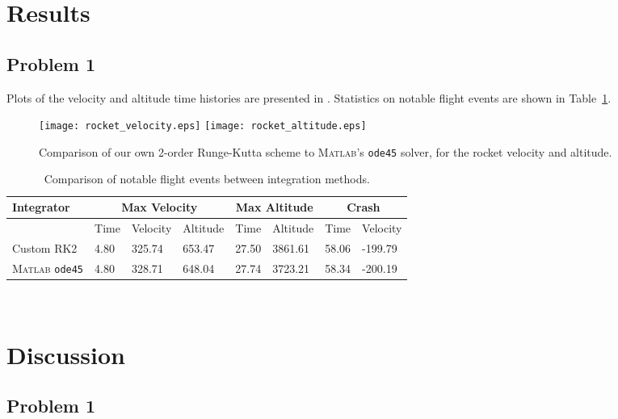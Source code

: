 \documentclass[12pt]{article}
\begin{document}
\section{Results}

\subsection{Problem 1}

Plots of the velocity and altitude time histories are presented in . Statistics on notable flight events are shown in Table~\ref{tbl:rocket}.

\begin{figure}[t]
\begin{center}
\texttt{[image: rocket\_velocity.eps]}
\texttt{[image: rocket\_altitude.eps]}
\\[6pt]
\caption{Comparison of our own 2\nd-order Runge-Kutta scheme to \textsc{Matlab}'s \lstinline|ode45| solver, for the rocket velocity and altitude.}
\label{fig:rocket_plots}
\end{center}
\end{figure}

\begin{table}[t]
\centering
\begin{tabular}{llllllll}
\toprule
Integrator   & \multicolumn{3}{c}{Max Velocity} & \multicolumn{2}{c}{Max Altitude} & \multicolumn{2}{c}{Crash} \\
\midrule
~            & Time & Velocity & Altitude       & Time         & Altitude & Time  & Velocity \\
Custom RK2                        & 4.80 & 325.74   & 653.47  & 27.50  & 3861.61  & 58.06 & -199.79  \\
\textsc{Matlab} \lstinline|ode45| & 4.80 & 328.71   & 648.04  & 27.74  & 3723.21  & 58.34 & -200.19 \\
\bottomrule
\end{tabular}
\\[6pt]
\caption{Comparison of notable flight events between integration methods.}
\label{tbl:rocket}
\end{table}

\section{Discussion}

\subsection*{Problem 1}
\end{document}
